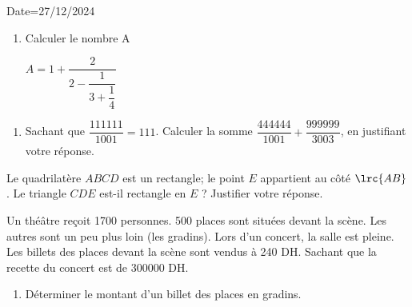\documentclass[a4paper,12pt]{article}
\begin{document}
\begin{Maquette}[Olym]{Date=27/12/2024}

\begin{exercice}
\begin{minipage}{.3\linewidth}
\begin{enumerate}
\item{} Calculer le nombre A

$A=1+\dfrac{2}{2-\dfrac{1}{3+\dfrac{1}{4}}} $
\end{enumerate}
\end{minipage}%
\begin{minipage}{.7\linewidth}
\anserline[10]
\end{minipage}

\end{exercice}

\begin{exercice}
\begin{enumerate}
\item{} Sachant que $\dfrac{111111}{1001}=111$.
 Calculer la somme $\dfrac{444444}{1001}+\dfrac{999999}{3003}$, en justifiant votre réponse.
 \end{enumerate}
 \anserline[11]
\end{exercice}

\begin{exercice}
\begin{minipage}{0.7\linewidth}
Le quadrilatère $ABCD$ est un rectangle; le point $E$ appartient au côté $\lrc{AB}$.
Le triangle $CDE$ est-il rectangle en $E$ ? Justifier votre réponse.
\end{minipage}%
\begin{minipage}{0.3\linewidth}
\end{minipage}
\anserline[6]
\end{exercice}

\begin{exercice}
Un théâtre reçoit 1700 personnes. 500 places sont situées devant la scène. Les autres sont un peu plus loin (les gradins).
Lors d'un concert, la salle est pleine. Les billets des places devant la scène sont vendus à 240 DH. Sachant que la recette du concert est de 300000 DH.
\begin{enumerate}
\item Déterminer le montant d'un billet des places en gradins.


\end{enumerate}
\end{exercice}
\end{Maquette}
\end{document}
